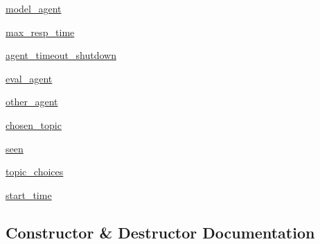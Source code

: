 \begin{DoxyCompactItemize}
\item 
\hyperlink{classprojects_1_1wizard__of__wikipedia_1_1mturk__evaluation__task_1_1worlds_1_1WizardEval_a55e5a388195e3eb5455bc3fdd004b5e0}{model\+\_\+agent}
\item 
\hyperlink{classprojects_1_1wizard__of__wikipedia_1_1mturk__evaluation__task_1_1worlds_1_1WizardEval_acf3ad9fdd1d432a9a520ea8bce150f4f}{max\+\_\+resp\+\_\+time}
\item 
\hyperlink{classprojects_1_1wizard__of__wikipedia_1_1mturk__evaluation__task_1_1worlds_1_1WizardEval_aef19629b948f594f5db8b97a0a482c00}{agent\+\_\+timeout\+\_\+shutdown}
\item 
\hyperlink{classprojects_1_1wizard__of__wikipedia_1_1mturk__evaluation__task_1_1worlds_1_1WizardEval_a07a6ad3dcadff66b04e4e9eb652f4910}{eval\+\_\+agent}
\item 
\hyperlink{classprojects_1_1wizard__of__wikipedia_1_1mturk__evaluation__task_1_1worlds_1_1WizardEval_a18f6c2c8871d9f39ba0c7a205b05aa8e}{other\+\_\+agent}
\item 
\hyperlink{classprojects_1_1wizard__of__wikipedia_1_1mturk__evaluation__task_1_1worlds_1_1WizardEval_a72f089d7257435bf9e1cb20ba293d4ad}{chosen\+\_\+topic}
\item 
\hyperlink{classprojects_1_1wizard__of__wikipedia_1_1mturk__evaluation__task_1_1worlds_1_1WizardEval_a6295bb9c04061cacd467fbcb9c3ff6b6}{seen}
\item 
\hyperlink{classprojects_1_1wizard__of__wikipedia_1_1mturk__evaluation__task_1_1worlds_1_1WizardEval_a3777176fe6a2ef5586e2dbbe2b4e9894}{topic\+\_\+choices}
\item 
\hyperlink{classprojects_1_1wizard__of__wikipedia_1_1mturk__evaluation__task_1_1worlds_1_1WizardEval_a46e08a2e5573f3748e8fba9e8122931c}{start\+\_\+time}
\end{DoxyCompactItemize}


\subsection{Constructor \& Destructor Documentation}
\mbox{\label{classprojects_1_1wizard__of__wikipedia_1_1mturk__evaluation__task_1_1worlds_1_1WizardEval_aca423a5d725be8a770f2f9c880f84122}} 

